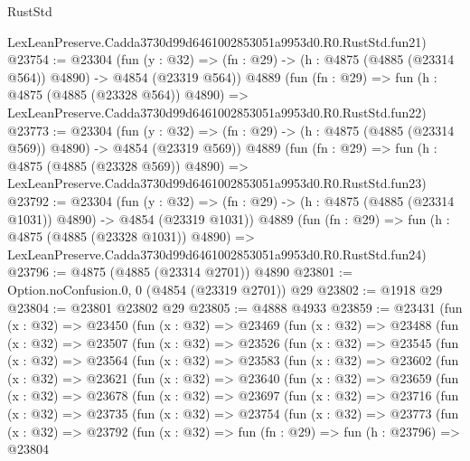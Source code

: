 \begin{lexlean}{RustStd}
\begin{coremodule}
    LexLeanPreserve.Cadda3730d99d6461002853051a9953d0.R0.RustStd.fun21)
@23754 := @23304
    (fun (y : @32) => (fn : @29) -> (h : @4875 (@4885 (@23314 @564)) @4890) -> @4854 (@23319 @564))
    @4889
    (fun (fn : @29) =>
    fun (h : @4875 (@4885 (@23328 @564)) @4890) =>
    LexLeanPreserve.Cadda3730d99d6461002853051a9953d0.R0.RustStd.fun22)
@23773 := @23304
    (fun (y : @32) => (fn : @29) -> (h : @4875 (@4885 (@23314 @569)) @4890) -> @4854 (@23319 @569))
    @4889
    (fun (fn : @29) =>
    fun (h : @4875 (@4885 (@23328 @569)) @4890) =>
    LexLeanPreserve.Cadda3730d99d6461002853051a9953d0.R0.RustStd.fun23)
@23792 := @23304
    (fun (y : @32) =>
    (fn : @29) -> (h : @4875 (@4885 (@23314 @1031)) @4890) -> @4854 (@23319 @1031))
    @4889
    (fun (fn : @29) =>
    fun (h : @4875 (@4885 (@23328 @1031)) @4890) =>
    LexLeanPreserve.Cadda3730d99d6461002853051a9953d0.R0.RustStd.fun24)
@23796 := @4875 (@4885 (@23314 @2701)) @4890
@23801 := Option.noConfusion.{0, 0} (@4854 (@23319 @2701)) @29
@23802 := @1918 @29
@23804 := @23801 @23802 @29
@23805 := @4888 @4933
@23859 := @23431
    (fun (x : @32) =>
    @23450
      (fun (x : @32) =>
      @23469
        (fun (x : @32) =>
        @23488
          (fun (x : @32) =>
          @23507
            (fun (x : @32) =>
            @23526
              (fun (x : @32) =>
              @23545
                (fun (x : @32) =>
                @23564
                  (fun (x : @32) =>
                  @23583
                    (fun (x : @32) =>
                    @23602
                      (fun (x : @32) =>
                      @23621
                        (fun (x : @32) =>
                        @23640
                          (fun (x : @32) =>
                          @23659
                            (fun (x : @32) =>
                            @23678
                              (fun (x : @32) =>
                              @23697
                                (fun (x : @32) =>
                                @23716
                                  (fun (x : @32) =>
                                  @23735
                                    (fun (x : @32) =>
                                    @23754
                                      (fun (x : @32) =>
                                      @23773
                                        (fun (x : @32) =>
                                        @23792
                                          (fun (x : @32) =>
                                          fun (fn : @29) =>
                                          fun (h : @23796) =>
                                          @23804

\end{coremodule}
\end{lexlean}
